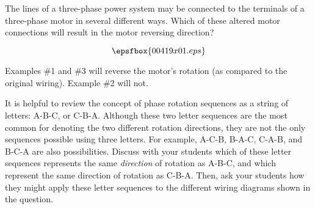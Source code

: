 

The lines of a three-phase power system may be connected to the terminals of a three-phase motor in several different ways.  Which of these altered motor connections will result in the motor reversing direction?

$$\epsfbox{00419x01.eps}$$







Examples \#1 and \#3 will reverse the motor's rotation (as compared to the original wiring).  Example \#2 will not.







It is helpful to review the concept of phase rotation sequences as a string of letters: A-B-C, or C-B-A.  Although these two letter sequences are the most common for denoting the two different rotation directions, they are not the only sequences possible using three letters.  For example, A-C-B, B-A-C, C-A-B, and B-C-A are also possibilities.  Discuss with your students which of these letter sequences represents the same {\it direction} of rotation as A-B-C, and which represent the same direction of rotation as C-B-A.  Then, ask your students how they might apply these letter sequences to the different wiring diagrams shown in the question.





